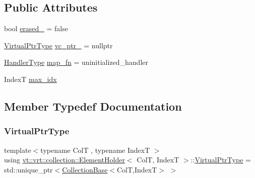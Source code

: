 \subsection*{Public Attributes}
\begin{DoxyCompactItemize}
\item 
bool \hyperlink{structvt_1_1vrt_1_1collection_1_1_element_holder_ae832cd8e53efb97b0b57497320d3fa2f}{erased\+\_\+} = false
\item 
\hyperlink{structvt_1_1vrt_1_1collection_1_1_element_holder_afc12d1a71ec8f735f1b7fe12a067c8a6}{Virtual\+Ptr\+Type} \hyperlink{structvt_1_1vrt_1_1collection_1_1_element_holder_a2112b3755d594225583fb89ab3185bd2}{vc\+\_\+ptr\+\_\+} = nullptr
\item 
\hyperlink{namespacevt_af64846b57dfcaf104da3ef6967917573}{Handler\+Type} \hyperlink{structvt_1_1vrt_1_1collection_1_1_element_holder_a53cb80f6a99dfbc30f7c2b6cb4c37490}{map\+\_\+fn} = uninitialized\+\_\+handler
\item 
IndexT \hyperlink{structvt_1_1vrt_1_1collection_1_1_element_holder_afcd1a1a4cb305f3dd9f783ae07492a2e}{max\+\_\+idx}
\end{DoxyCompactItemize}


\subsection{Member Typedef Documentation}
\mbox{\label{structvt_1_1vrt_1_1collection_1_1_element_holder_afc12d1a71ec8f735f1b7fe12a067c8a6}} 
\subsubsection{\texorpdfstring{Virtual\+Ptr\+Type}{VirtualPtrType}}
{\footnotesize\ttfamily template$<$typename ColT , typename IndexT $>$ \\
using \hyperlink{structvt_1_1vrt_1_1collection_1_1_element_holder}{vt\+::vrt\+::collection\+::\+Element\+Holder}$<$ ColT, IndexT $>$\+::\hyperlink{structvt_1_1vrt_1_1collection_1_1_element_holder_afc12d1a71ec8f735f1b7fe12a067c8a6}{Virtual\+Ptr\+Type} =  std\+::unique\+\_\+ptr$<$\hyperlink{structvt_1_1vrt_1_1collection_1_1_collection_base}{Collection\+Base}$<$ColT,IndexT$>$ $>$}



